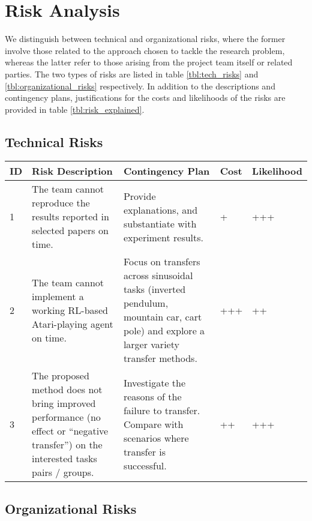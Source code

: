 \section{Risk Analysis}
\label{sec:risk}

We distinguish between technical and organizational risks, where the former involve those related to the approach chosen to tackle the research problem, whereas the latter refer to those arising from the project team itself or related parties. The two types of risks are listed in table \ref{tbl:tech_risks} and \ref{tbl:organizational_risks} respectively. In addition to the descriptions and contingency plans, justifications for the costs and likelihoods of the risks are provided in table \ref{tbl:risk_explained}.

\subsection{Technical Risks}
\begin{center} 
	\small
	\begin{tabular}{  p{} p{} p{} p{} p{} }
		\toprule
		\textbf{ID} & \textbf{Risk Description} & \textbf{Contingency Plan} & \textbf{Cost} & \textbf{Likelihood} 		 \\ 
		\midrule
		1 & 
		The team cannot reproduce the results reported in selected papers on time. &
		Provide explanations, and substantiate with experiment results.  &
		+ &
		+++  \\
		2 & 
		The team cannot implement a working RL-based Atari-playing agent on time. &
		Focus on transfers across sinusoidal tasks (inverted pendulum, mountain car, cart pole) and explore a larger variety transfer methods.  &
		+++ &
		++  \\
		3 & 
		The proposed method does not bring improved performance (no effect or ``negative transfer'') on the interested tasks pairs / groups. &
		Investigate the reasons of the failure to transfer. Compare with scenarios where transfer is successful.  &
		++ &
		+++  \\
		\bottomrule
	\end{tabular}
\label{tbl:tech_risks}
\end{center}

\subsection{Organizational Risks}


